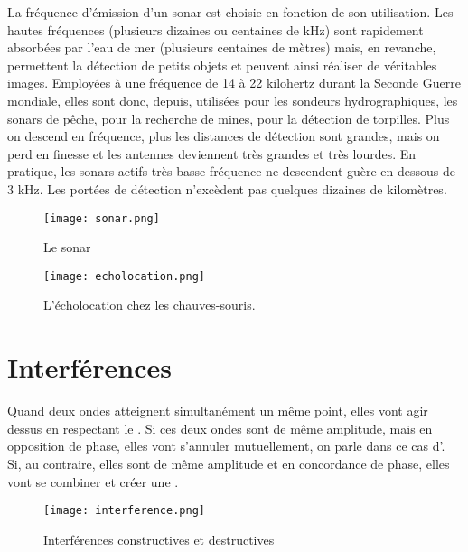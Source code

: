 \begin{tcolorbox}[title=Sonar]
    La fréquence d'émission d'un sonar est choisie en fonction de son utilisation. Les hautes fréquences (plusieurs dizaines ou centaines de kHz) sont rapidement absorbées par l'eau de mer (plusieurs centaines de mètres) mais, en revanche, permettent la détection de petits objets et peuvent ainsi réaliser de véritables images. Employées à une fréquence de 14 à 22 kilohertz durant la Seconde Guerre mondiale, elles sont donc, depuis, utilisées pour les sondeurs hydrographiques, les sonars de pêche, pour la recherche de mines, pour la détection de torpilles.
    Plus on descend en fréquence, plus les distances de détection sont grandes, mais on perd en finesse et les antennes deviennent très grandes et très lourdes. En pratique, les sonars actifs très basse fréquence ne descendent guère en dessous de 3 kHz. Les portées de détection n'excèdent pas quelques dizaines de kilomètres.
\end{tcolorbox}

\begin{figure}[ht]
    \begin{minipage}{.5\textwidth}
        \centering
        \texttt{[image: sonar.png]}
        \caption{Le sonar}
    \end{minipage}
    \begin{minipage}{.5\textwidth}
        \centering
        \texttt{[image: echolocation.png]}
        \caption{L'écholocation chez les chauves-souris.}
    \end{minipage}
\end{figure}

\newpage

\section{Interférences}
Quand deux ondes atteignent simultanément un même point, elles vont agir dessus en respectant le . Si ces deux ondes sont de même amplitude, mais en opposition de phase, elles vont s'annuler mutuellement, on parle dans ce cas d'.
Si, au contraire, elles sont de même amplitude et en concordance de phase, elles vont se combiner et créer une .

\begin{figure}[ht]
    \centering
    \texttt{[image: interference.png]}
    \caption{Interférences constructives et destructives}
\end{figure}

